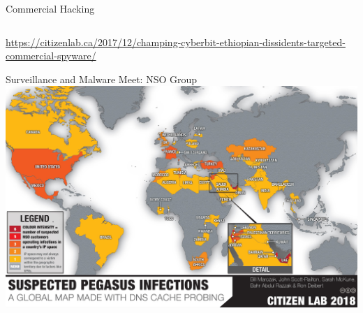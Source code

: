 \documentclass[nobackground,dvipsnames,table]{beamer}
\begin{document}
\begin{frame}{Commercial Hacking}
\begin{columns}
    \end{columns}
    \tiny
    \url{https://citizenlab.ca/2017/12/champing-cyberbit-ethiopian-dissidents-targeted-commercial-spyware/}
\end{frame}

\begin{frame}{Surveillance and Malware Meet: NSO Group}
    \includegraphics[width=\textwidth]{pegasus-infection-map}
\end{frame}
\end{document}
